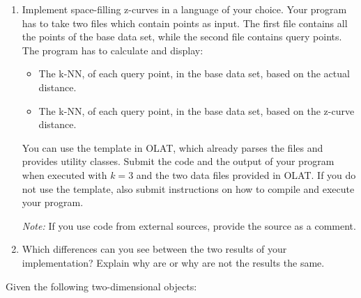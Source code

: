 


\newcommand{\subtitle}{\textbf{Exercise 7}}
\newcommand{\outdate}{04.12.2023}
\newcommand{\duedate}{11.12.2023 12:00 MEZ}
\newcommand{\video}{036}

\usepackage{tkz-euclide}




\begin{enumerate}
  \item 
  Implement space-filling z-curves in a language of your choice.
Your program has to take two files which contain points as input.
The first file contains all the points of the base data set, while the second file contains query points.
The program has to calculate and display:
\begin{itemize}
\item The k-NN, of each query point, in the base data set, based on the actual distance.
\item The k-NN, of each query point, in the base data set, based on the z-curve distance.
\end{itemize}

You can use the template in OLAT, which already parses the files and provides utility classes.
Submit the code and the output of your program when executed with $k = 3$ and the two data files provided in OLAT.
If you do not use the template, also submit instructions on how to compile and execute your program.

\textit{Note: } If you use code from external sources, provide the source as a comment. 

\item
Which differences can you see between the two results of your implementation?
Explain why are or why are not the results the same.

\end{enumerate}

\newpage


Given the following two-dimensional objects:

